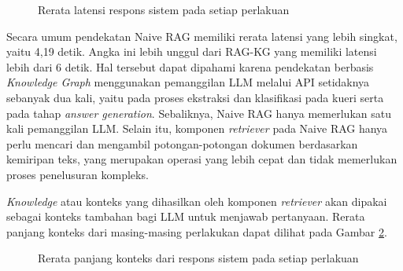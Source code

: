 \begin{figure}[H]
	\centering
	\caption{Rerata latensi respons sistem pada setiap perlakuan}
	\label{fig:latency-per-treatment}
\end{figure}

Secara umum pendekatan Naive RAG memiliki rerata latensi yang lebih singkat, yaitu 4,19 detik.
Angka ini lebih unggul dari RAG-KG yang memiliki latensi lebih dari 6 detik.
Hal tersebut dapat dipahami karena pendekatan berbasis \textit{Knowledge Graph} menggunakan pemanggilan LLM melalui API setidaknya sebanyak dua kali, yaitu pada proses ekstraksi dan klasifikasi pada kueri serta pada tahap \textit{answer generation}.
Sebaliknya, Naive RAG hanya memerlukan satu kali pemanggilan LLM.
Selain itu, komponen \textit{retriever} pada Naive RAG hanya perlu mencari dan mengambil potongan-potongan dokumen berdasarkan kemiripan teks, yang merupakan operasi yang lebih cepat dan tidak memerlukan proses penelusuran kompleks.

\textit{Knowledge} atau konteks yang dihasilkan oleh komponen \textit{retriever} akan dipakai sebagai konteks tambahan bagi LLM untuk menjawab pertanyaan.
Rerata panjang konteks dari masing-masing perlakukan dapat dilihat pada Gambar \ref{fig:context-length-per-treatment}.

\begin{figure}[H]
	\centering
	\caption{Rerata panjang konteks dari respons sistem pada setiap perlakuan}
	\label{fig:context-length-per-treatment}
\end{figure}

